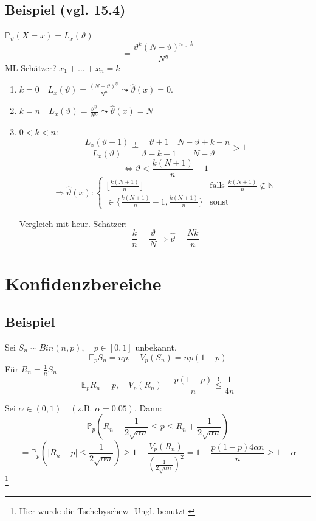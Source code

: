\documentclass[a4paper,11pt,notitlepage]{report}
\newcommand{\N}{{\ensuremath{\mathbb{N}}}}
\newcommand{\Prim}{{\ensuremath{\mathbb{P}}}}
\newcommand{\E}{{\ensuremath{\mathbb{E}}}}
\begin{document}
\section{Beispiel (vgl. 15.4)}
$\Prim_\vartheta (X=x) = L_x(\vartheta)$
$$= \frac{\vartheta^{\underline{k}} (N-\vartheta)^{\underline{n-k}}}{N^{\underline{n}}}$$
ML-Schätzer? $x_1 + \ldots + x_n = k$
\begin{enumerate}
	\item $k=0 \quad L_x(\vartheta) = \frac{(N-\vartheta)^{\underline{n}}}{N^{\underline{n}}} \leadsto \hat{\vartheta}(x) = 0.$
	\item $k = n \quad L_x(\vartheta) = \frac{\vartheta^{\underline{n}}}{N^{\underline{n}}} \leadsto \hat{\vartheta}(x) = N$
	\item $0 < k < n:$
	$$\frac{L_x(\vartheta + 1)}{L_x(\vartheta)} \overset{!}{=} \frac{\vartheta +1}{\vartheta - k + 1} \frac{N- \vartheta + k - n}{N - \vartheta} > 1$$
	$$\Leftrightarrow \vartheta < \frac{k(N+1)}{n} - 1$$
	$$\Rightarrow \hat{\vartheta}(x) : \begin{cases} \lfloor \frac{k(N+1)}{n} \rfloor & \text{falls } \frac{k(N+1)}{n} \notin \N \\ \in \{ \frac{k(N+1)}{n} - 1, \frac{k(N+1)}{n}\} & \text{sonst} \end{cases}$$
	
	Vergleich mit heur. Schätzer:
	$$\frac{k}{n} = \frac{\vartheta}{N} \Rightarrow \hat{\vartheta} = \frac{Nk}{n}$$
\end{enumerate}

\chapter{Konfidenzbereiche}
\section{Beispiel}
Sei $S_n \sim Bin(n,p), \quad p \in [0,1]$ unbekannt.
$$\E_p S_n = np, \quad V_p (S_n) = n p (1-p)$$
Für $R_n = \frac{1}{n} S_n$
$$\E_p R_n = p, \quad V_p (R_n) = \frac{p (1-p)}{n} \overset{!}{\leq} \frac{1}{4n}$$

Sei $\alpha \in (0,1) \quad (\text{z.B. } \alpha = 0.05)$. Dann:
$$\Prim_p(R_n - \frac{1}{2 \sqrt{\alpha n}} \leq p \leq R_n + \frac{1}{2 \sqrt{\alpha n}})$$
$$= \Prim_p(|R_n - p| \leq \frac{1}{2 \sqrt{\alpha n}}) \geq 1 - \frac{V_p(R_n)}{(\frac{1}{2 \sqrt{\alpha n}})^2} = 1 - \frac{p (1-p) 4 \alpha n}{n} \geq 1 - \alpha$$ \footnote{Hier wurde die Tschebyschew- Ungl. benutzt.}
\end{document}
